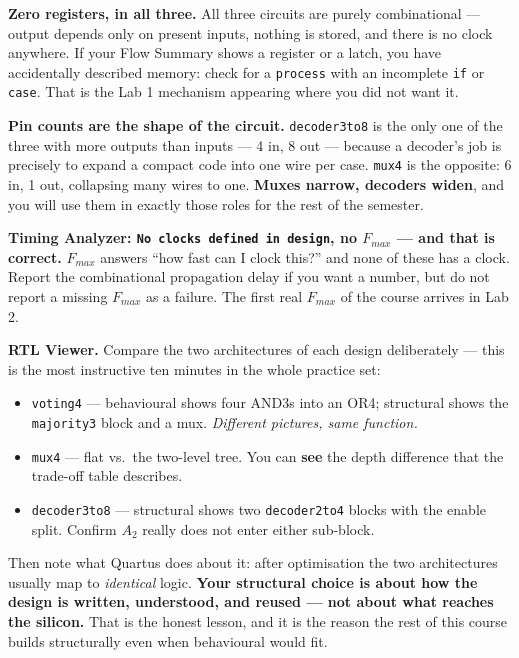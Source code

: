 \documentclass[11pt]{article}
\newcommand{\code}[1]{\texttt{#1}}
\begin{document}
\textbf{Zero registers, in all three.} All three circuits are purely combinational
--- output depends only on present inputs, nothing is stored, and there is no clock
anywhere. If your Flow Summary shows a register or a latch, you have accidentally
described memory: check for a \code{process} with an incomplete \code{if} or
\code{case}. That is the Lab 1 mechanism appearing where you did not want it.

\textbf{Pin counts are the shape of the circuit.} \code{decoder3to8} is the only one
of the three with more outputs than inputs --- 4 in, 8 out --- because a decoder's
job is precisely to expand a compact code into one wire per case. \code{mux4} is the
opposite: 6 in, 1 out, collapsing many wires to one. \textbf{Muxes narrow, decoders
widen}, and you will use them in exactly those roles for the rest of the semester.

\textbf{Timing Analyzer: \code{No clocks defined in design}, no $F_{max}$ --- and
that is correct.}
$F_{max}$ answers ``how fast can I clock this?'' and none of these has a clock.
Report the combinational propagation delay if you want a number, but do not report a
missing $F_{max}$ as a failure. The first real $F_{max}$ of the course arrives in
Lab 2.

\textbf{RTL Viewer.} Compare the two architectures of each design deliberately ---
this is the most instructive ten minutes in the whole practice set:

\begin{itemize}[leftmargin=1.6em,itemsep=1pt]
\item \code{voting4} --- behavioural shows four AND3s into an OR4; structural shows
the \code{majority3} block and a mux. \emph{Different pictures, same function.}
\item \code{mux4} --- flat vs.\ the two-level tree. You can \textbf{see} the depth
difference that the trade-off table describes.
\item \code{decoder3to8} --- structural shows two \code{decoder2to4} blocks with the
enable split. Confirm $A_2$ really does not enter either sub-block.
\end{itemize}

Then note what Quartus does about it: after optimisation the two architectures
usually map to \emph{identical} logic. \textbf{Your structural choice is about how
the design is written, understood, and reused --- not about what reaches the
silicon.} That is the honest lesson, and it is the reason the rest of this course
builds structurally even when behavioural would fit.
\end{document}
